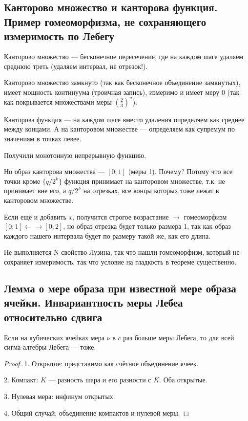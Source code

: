 \documentclass[12pt, a4paper, oneside]{memoir}
\begin{document}
\subsection{Канторово множество и канторова функция.
Пример гомеоморфизма, не сохраняющего измеримость по Лебегу}

Канторово множество — бесконечное пересечение, где на каждом шаге удаляем среднюю треть
(удаляем интервал, не отрезок!).

Канторово множество замкнуто (так как бесконечное объединение замкнутых), имеет мощность континуума (троичная запись), измеримо и имеет меру 0
(так как покрывается множествами меры $\left(\frac{2}{3}\right)^n$).

Канторова функция — на каждом шаге вместо удаления определяем как среднее между концами.
А на канторовом множестве — определяем как супремум по значениям в точках левее.

Получили монотонную непрерывную функцию.

Но образ канторова множества — $[0; 1]$ (меры 1).
Почему? Потому что все точки кроме $\{q/2^k\}$ функция принимает на канторовом множестве, т.к. не принимает вне его, а ${q/2^k}$ на отрезках, все концы которых тоже лежат в канторовом множестве.

Если ещё и добавить $x$, получится строгое возрастание $→$ гомеоморфизм $[0; 1] ←→ [0; 2]$, но образ отрезка будет только размера 1, так как образ каждого нашего интервала будет по размеру такой же, как его длина.


Не выполняется N-свойство Лузина, так что нашли гомеоморфизм,
который не сохраняет измеримость, так что условие на гладкость в теореме существенно.



\subsection{Лемма о мере образа при известной мере образа ячейки.
Инвариантность меры Лебеа относительно сдвига}

\begin{lemma}

    Если на кубических ячейках мера $\nu$ в $c$ раз больше меры Лебега,
    то для всей сигма-алгебры Лебега — тоже.
 
    \begin{proof}
        1. Открытое: представимо как счётное объединение ячеек.
        
        2. Компакт: $K$ — разность шара и его разности с $K$. Оба открытые.

        3. Нулевая мера: инфинум открытых.

        4. Общий случай: объединение компактов и нулевой меры.
    \end{proof}
\end{lemma}
\end{document}
